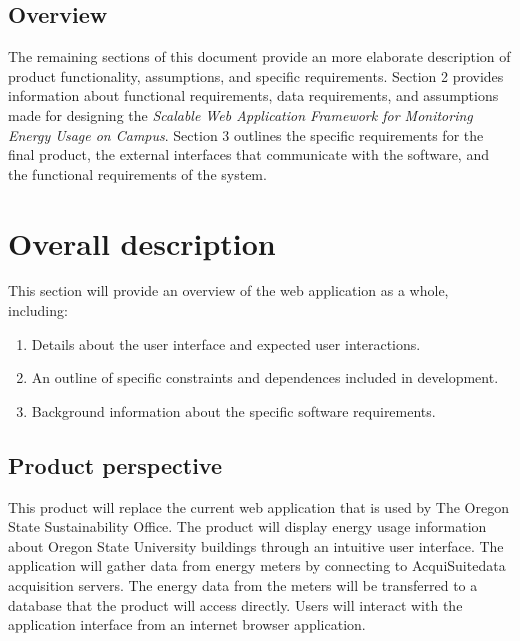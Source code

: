 \documentclass[journal,10pt,onecolumn,compsoc]{IEEEtran}
\begin{document}
    \subsection{Overview}
	The remaining sections of this document provide an more elaborate description of product functionality, assumptions, and specific requirements. Section 2 provides information about functional requirements, data requirements, and assumptions made for designing the \textit{Scalable Web Application Framework for Monitoring Energy Usage on Campus}. Section 3 outlines the specific requirements for the final product, the external interfaces that communicate with the software, and the functional requirements of the system.
	
    \section{Overall description}
    This section will provide an overview of the web application as a whole, including:
        \begin{enumerate} 
            \item Details about the user interface and expected user interactions.
            \item An outline of specific constraints and dependences included in development. 
            \item Background information about the specific software requirements.
        \end{enumerate}
    \subsection{Product perspective}

    This product will replace the current web application that is used by The Oregon State Sustainability Office. The product will display energy usage information about Oregon State University buildings through an intuitive user interface. The application will gather data from energy meters by connecting to AcquiSuite\texttrademark data acquisition servers. The energy data from the meters will be transferred to a database that the product will access directly. Users will interact with the application interface from an internet browser application. 
    
\end{document}
